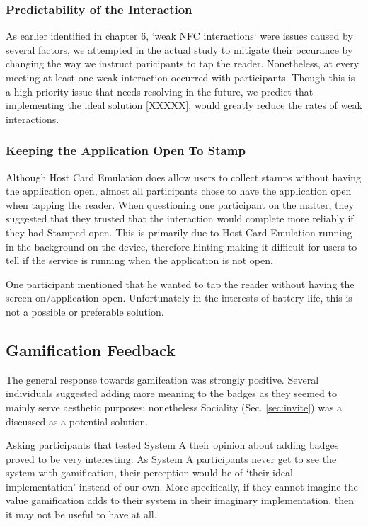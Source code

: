 \subsubsection{Predictability of the Interaction}
As earlier identified in chapter 6, `weak NFC interactions` were issues caused by several factors, we attempted in the actual study to mitigate their occurance by changing the way we instruct paricipants to tap the reader. Nonetheless, at every meeting at least one weak interaction occurred with participants. Though this is a high-priority issue that needs resolving in the future, we predict that implementing the ideal solution \ref{XXXXX}, would greatly reduce the rates of weak interactions.
\subsubsection{Keeping the Application Open To Stamp}
Although Host Card Emulation does allow users to collect stamps without having the application open, almost all participants chose to have the application open when tapping the reader. When questioning one participant on the matter, they suggested that they trusted that the interaction would complete more reliably if they had Stamped open. This is primarily due to Host Card Emulation running in the background on the device, therefore hinting making it difficult for users to tell if the service is running when the application is not open.

One participant mentioned that he wanted to tap the reader without having the screen on/application open. Unfortunately in the interests of battery life, this is not a possible or preferable solution. 
\subsection{Gamification Feedback}
The general response towards gamifcation was strongly positive. Several individuals suggested adding more meaning to the badges as they seemed to mainly serve aesthetic purposes; nonetheless Sociality (Sec. \ref{sec:invite}) was a discussed as a potential solution.

Asking participants that tested System A their opinion about adding badges proved to be very interesting. As System A participants never get to see the system with gamification, their perception would be of `their ideal implementation' instead of our own. More specifically, if they cannot imagine the value gamification adds to their system in their imaginary implementation, then it may not be useful to have at all.

